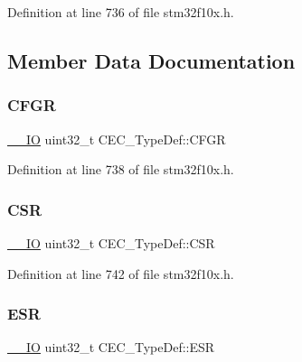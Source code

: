 Definition at line 736 of file stm32f10x.\+h.



\subsection{Member Data Documentation}
\mbox{\label{struct_c_e_c___type_def_a91a55cd277c20e5c5ad228fd9013d014}} 
\subsubsection{\texorpdfstring{C\+F\+GR}{CFGR}}
{\footnotesize\ttfamily \hyperlink{core__sc300_8h_aec43007d9998a0a0e01faede4133d6be}{\+\_\+\+\_\+\+IO} uint32\+\_\+t C\+E\+C\+\_\+\+Type\+Def\+::\+C\+F\+GR}



Definition at line 738 of file stm32f10x.\+h.

\mbox{\label{struct_c_e_c___type_def_ad9aa13645f701c5457fbf51a9ecf7aa4}} 
\subsubsection{\texorpdfstring{C\+SR}{CSR}}
{\footnotesize\ttfamily \hyperlink{core__sc300_8h_aec43007d9998a0a0e01faede4133d6be}{\+\_\+\+\_\+\+IO} uint32\+\_\+t C\+E\+C\+\_\+\+Type\+Def\+::\+C\+SR}



Definition at line 742 of file stm32f10x.\+h.

\mbox{\label{struct_c_e_c___type_def_a90adcbf5ee626747170b2f208770628f}} 
\subsubsection{\texorpdfstring{E\+SR}{ESR}}
{\footnotesize\ttfamily \hyperlink{core__sc300_8h_aec43007d9998a0a0e01faede4133d6be}{\+\_\+\+\_\+\+IO} uint32\+\_\+t C\+E\+C\+\_\+\+Type\+Def\+::\+E\+SR}



